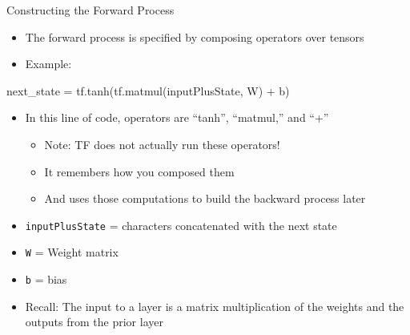 \documentclass[aspectratio=169]{beamer}
\begin{document}
\begin{frame}[fragile]{Constructing the Forward Process}

\begin{itemize}
\item The forward process is specified by composing operators over tensors
\item Example:
\end{itemize}
	\begin{SQL}
next_state = tf.tanh(tf.matmul(inputPlusState, W) + b)	
	\end{SQL}
	\begin{itemize}
	\item In this line of code, operators are ``tanh'', ``matmul,'' and ``+''
	\begin{itemize}
	\item Note: TF does not actually run these operators!
	\item It remembers how you composed them
	\item And uses those computations to build the backward process later
\end{itemize}
\item \texttt{inputPlusState} = characters concatenated with the next state
\item \texttt{W} = Weight matrix
\item \texttt{b} = bias
\item Recall: The input to a layer is a matrix multiplication of the weights and the outputs from the prior layer

	\end{itemize}

\end{frame}
\end{document}
